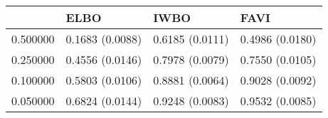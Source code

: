 \begin{tabular}{llll}
\toprule
 & ELBO & IWBO & FAVI \\
\midrule
0.500000 & 0.1683 (0.0088) & 0.6185 (0.0111) & 0.4986 (0.0180) \\
0.250000 & 0.4556 (0.0146) & 0.7978 (0.0079) & 0.7550 (0.0105) \\
0.100000 & 0.5803 (0.0106) & 0.8881 (0.0064) & 0.9028 (0.0092) \\
0.050000 & 0.6824 (0.0144) & 0.9248 (0.0083) & 0.9532 (0.0085) \\
\bottomrule
\end{tabular}
